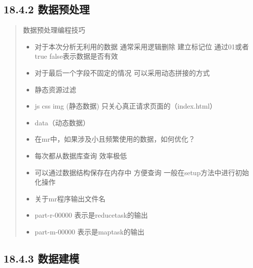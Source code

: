 \subsection{18.4.2 数据预处理}\label{ux6570ux636eux9884ux5904ux7406}

\begin{quote}
数据预处理编程技巧

\begin{itemize}
\item
  对于本次分析无利用的数据 通常采用逻辑删除 建立标记位 通过01或者true
  false表示数据是否有效
\item
  对于最后一个字段不固定的情况 可以采用动态拼接的方式
\item
  静态资源过滤
\item
  js css img (静态数据) 只关心真正请求页面的（index.html）
\item
  data（动态数据）
\item
  在mr中，如果涉及小且频繁使用的数据，如何优化？
\item
  每次都从数据库查询 效率极低
\item
  可以通过数据结构保存在内存中 方便查询 一般在setup方法中进行初始化操作
\item
  关于mr程序输出文件名
\item
  part-r-00000 表示是reducetask的输出
\item
  part-m-00000 表示是maptask的输出
\end{itemize}
\end{quote}

\subsection{18.4.3 数据建模}\label{ux6570ux636eux5efaux6a21}

